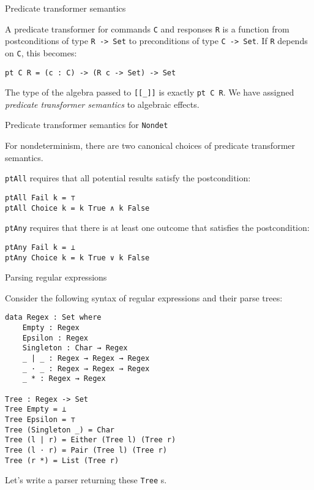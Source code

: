 \documentclass{beamer}
\newcommand{\Agda}[1]{\texttt{\footnotesize #1}\xspace}
\newcommand{\Nondet}{\Agda{Nondet}}
\begin{document}
\begin{frame}[fragile]{Predicate transformer semantics}

A predicate transformer for commands \Agda{C} and responses \Agda{R}
is a function from postconditions of type \Agda{R -> Set} to preconditions of type \Agda{C -> Set}.
If \Agda{R} depends on \Agda{C}, this becomes:

\begin{verbatim}
pt C R = (c : C) -> (R c -> Set) -> Set
\end{verbatim}

The type of the algebra passed to \Agda{[[\_]]} is exactly \Agda{pt C R}.
We have assigned \emph{predicate transformer semantics} to algebraic effects.

\end{frame}

\begin{frame}[fragile]{Predicate transformer semantics for \Nondet}

For nondeterminism, there are two canonical choices of predicate transformer semantics.

\Agda{ptAll} requires that all potential results satisfy the postcondition:
\begin{verbatim}
ptAll Fail k = ⊤
ptAll Choice k = k True ∧ k False
\end{verbatim}

\Agda{ptAny} requires that there is at least one outcome that satisfies the postcondition:
\begin{verbatim}
ptAny Fail k = ⊥
ptAny Choice k = k True ∨ k False
\end{verbatim}

\end{frame}

\begin{frame}[fragile]{Parsing regular expressions}

Consider the following syntax of regular expressions and their parse trees:
\begin{verbatim}
data Regex : Set where
    Empty : Regex
    Epsilon : Regex
    Singleton : Char → Regex
    _ | _ : Regex → Regex → Regex
    _ · _ : Regex → Regex → Regex
    _ * : Regex → Regex

Tree : Regex -> Set
Tree Empty = ⊥
Tree Epsilon = ⊤
Tree (Singleton _) = Char
Tree (l | r) = Either (Tree l) (Tree r)
Tree (l · r) = Pair (Tree l) (Tree r)
Tree (r *) = List (Tree r)
\end{verbatim}

Let's write a parser returning these \Agda{Tree}s.
\end{frame}
\end{document}
